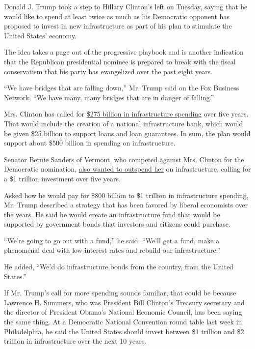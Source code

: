 Donald J. Trump took a step to Hillary Clinton's left on Tuesday, saying
that he would like to spend at least twice as much as his Democratic
opponent has proposed to invest in new infrastructure as part of his
plan to stimulate the United States' economy.

The idea takes a page out of the progressive playbook and is another
indication that the Republican presidential nominee is prepared to break
with the fiscal conservatism that his party has evangelized over the
past eight years.

``We have bridges that are falling down,'' Mr. Trump said on the Fox
Business Network. ``We have many, many bridges that are in danger of
falling.''

Mrs. Clinton has called for
\href{http://www.nytimes3xbfgragh.onion/politics/first-draft/2015/11/30/hillary-clinton-unveils-sprawling-and-expensive-infrastructure-investment-plan/}{\$275
billion in infrastructure spending} over five years. That would include
the creation of a national infrastructure bank, which would be given
\$25 billion to support loans and loan guarantees. In sum, the plan
would support about \$500 billion in spending on infrastructure.

Senator Bernie Sanders of Vermont, who competed against Mrs. Clinton for
the Democratic nomination,
\href{https://berniesanders.com/issues/creating-jobs-rebuilding-america/}{also
wanted to outspend her} on infrastructure, calling for a \$1 trillion
investment over five years.

Asked how he would pay for \$800 billion to \$1 trillion in
infrastructure spending, Mr. Trump described a strategy that has been
favored by liberal economists over the years. He said he would create an
infrastructure fund that would be supported by government bonds that
investors and citizens could purchase.

``We're going to go out with a fund,'' he said. ``We'll get a fund, make
a phenomenal deal with low interest rates and rebuild our
infrastructure.''

He added, ``We'd do infrastructure bonds from the country, from the
United States.''

If Mr. Trump's call for more spending sounds familiar, that could be
because Lawrence H. Summers, who was President Bill Clinton's Treasury
secretary and the director of President Obama's National Economic
Council, has been saying the same thing. At a Democratic National
Convention round table last week in Philadelphia, he said the United
States should invest between \$1 trillion and \$2 trillion in
infrastructure over the next 10 years.

